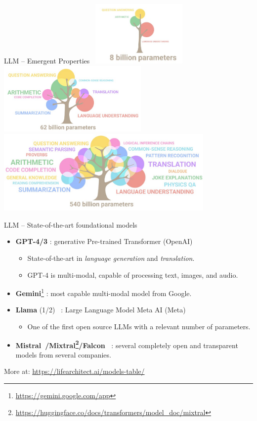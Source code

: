 \documentclass[presentation, 10pt]{beamer}\mode<presentation>{\usetheme{AMSBolognaFC}}
\begin{document}
\begin{frame}{LLM -- Emergent Properties~\cite{DBLP:journals/tmlr/WeiTBRZBYBZMCHVLDF22}}
\includegraphics[width=0.35\textwidth]{img/small.jpg}
\includegraphics[width=0.55\textwidth]{img/medium.jpg}
\centering
\includegraphics[width=0.8\textwidth]{img/big.jpg}
\end{frame}
\begin{frame}{LLM -- State-of-the-art foundational models}
	\begin{itemize}
		\item \textbf{GPT-4/3} \faLock: generative Pre-trained Transformer (OpenAI)
		\begin{itemize}
			\item State-of-the-art in \emph{language generation} and \emph{translation}.
			\item GPT-4 is multi-modal, capable of processing text, images, and audio.
		\end{itemize}
		\item \textbf{Gemini}\footnote{\url{https://gemini.google.com/app}} \faLock: most capable multi-modal model from Google.
		\item \textbf{Llama} (1/2)~\cite{touvron2023llama} \faUnlock: Large Language Model Meta AI (Meta) 
		\begin{itemize}
			\item One of the first open source LLMs with a relevant number of parameters.
		\end{itemize}
		\item \textbf{Mistral~\cite{jiang2023mistral}/Mixtral\footnote{\url{https://huggingface.co/docs/transformers/model_doc/mixtral}}/Falcon~\cite{almazrouei2023falcon}} \faUnlock: several completely open and transparent models from several companies. 
	\end{itemize}
\centering
More at: \url{https://lifearchitect.ai/models-table/}
\end{frame}
\end{document}
